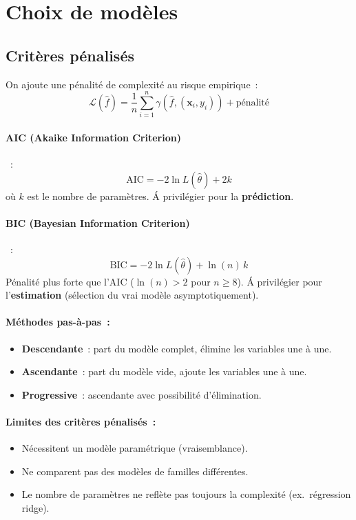 \documentclass[a4paper,11pt]{article}
\theoremstyle{definition}
\theoremstyle{remark}
\begin{document}
\section{Choix de mod\`eles}

\subsection{Crit\`eres p\'enalis\'es}

On ajoute une p\'enalit\'e de complexit\'e au risque empirique~:
\[
\mathcal{L}(\hat{f}) = \frac{1}{n}\sum_{i=1}^n
\gamma(\hat{f}, (\mathbf{x}_i, y_i)) + \text{p\'enalit\'e}
\]

\paragraph{AIC (Akaike Information Criterion)}~:
\[
\text{AIC} = -2\ln L(\hat{\theta}) + 2k
\]
\noindent o\`u $k$ est le nombre de param\`etres.
\'A privil\'egier pour la \textbf{pr\'ediction}.

\paragraph{BIC (Bayesian Information Criterion)}~:
\[
\text{BIC} = -2\ln L(\hat{\theta}) + \ln(n)\,k
\]
P\'enalit\'e plus forte que l'AIC ($\ln(n) > 2$ pour $n \ge 8$).
\'A privil\'egier pour l'\textbf{estimation} (s\'election du vrai
mod\`ele asymptotiquement).

\paragraph{M\'ethodes pas-\`a-pas~:}
\begin{itemize}
  \item \textbf{Descendante}~: part du mod\`ele complet, \'elimine
    les variables une \`a une.
  \item \textbf{Ascendante}~: part du mod\`ele vide, ajoute les
    variables une \`a une.
  \item \textbf{Progressive}~: ascendante avec possibilit\'e
    d'\'elimination.
\end{itemize}

\paragraph{Limites des crit\`eres p\'enalis\'es~:}
\begin{itemize}
  \item N\'ecessitent un mod\`ele param\'etrique (vraisemblance).
  \item Ne comparent pas des mod\`eles de familles diff\'erentes.
  \item Le nombre de param\`etres ne refl\`ete pas toujours la
    complexit\'e (ex.~r\'egression ridge).
\end{itemize}
\end{document}

